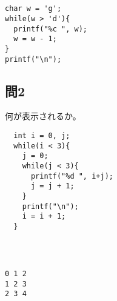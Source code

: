 \documentclass[a4j]{jarticle}
\def\ans#1#2{
\ifnum \anss=1
#1
\else
#2
\fi
}
\begin{document}
\begin{multicols*}{2}
\ifnum {}
\begin{verbatim}






\end{verbatim}
\else
\begin{verbatim}
char w = 'g';
while(w > 'd'){
  printf("%c ", w);
  w = w - 1;
}
printf("\n");
\end{verbatim}
\fi
\vspace{6cm}



\subsection*{問2}


何が表示されるか。



\begin{verbatim}
  int i = 0, j;
  while(i < 3){
    j = 0;
    while(j < 3){
      printf("%d ", i+j);
      j = j + 1;
    }
    printf("\n");
    i = i + 1;
  }
\end{verbatim}


\ifnum {}
\begin{verbatim}



\end{verbatim}
\else
\begin{verbatim}
0 1 2
1 2 3
2 3 4
\end{verbatim}
\fi



%
%
%
%










\end{multicols*}
\end{document}
